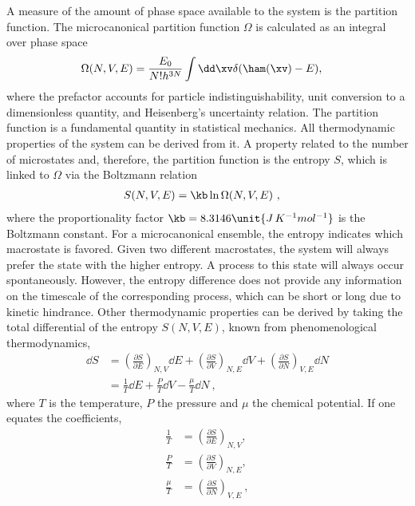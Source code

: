 %
A measure of the amount of phase space available to the system is the partition function. The microcanonical partition function $\Omega$ is calculated as an integral over phase space
%
\begin{align}
        \Omega(N,V,E) %
                      &= \frac{E_0}{N!h^{3N}} \int \dd \xv \delta(\ham(\xv) - E ),
\end{align}
%
where the prefactor 
accounts for particle indistinguishability,
unit conversion to a dimensionless quantity,
and Heisenberg's uncertainty relation.
%
The partition function is a fundamental quantity in statistical mechanics. All thermodynamic properties of the system can be derived from it. %
A property related to the number of microstates and, therefore, the partition function is the entropy $S$, which is linked to $\Omega$ via the Boltzmann relation
%
\begin{align}
        S(N,V,E) &= \kb \ln \Omega (N,V,E)\ ,
        \label{eq:boltzmann}
\end{align}
%
where the proportionality factor $\kb=8.3146\unit{J\,K^{-1}mol^{-1}}$ is the Boltzmann constant. 
For a microcanonical ensemble, the entropy indicates which macrostate is favored.
Given two different macrostates, the system will always prefer the state with the higher entropy. A process to this state will always occur spontaneously. However, the entropy difference does not 
provide
any information on the timescale of the corresponding process, which can
be short or 
long due to kinetic hindrance. Other thermodynamic properties can be derived by taking the total differential of the entropy $S(N,V,E)$, known from phenomenological thermodynamics,
%
\begin{align}
\dd S &= \left ( \frac{\partial S}{\partial E}\right ) _{N,V} \dd E +
\left ( \frac{\partial S}{\partial V} \right ) _{N,E} \dd V + \left ( \frac{\partial S}{\partial N} \right ) _{V,E} \dd N  \nonumber \\
 & = \frac{1}{T} \dd E + \frac{P}{T} \dd V - \frac{\mu}{T} \dd N\ ,
 \label{eq:tots}
\end{align}
%
where $T$ is the temperature, $P$ the pressure and $\mu$ the chemical potential.
If one equates the coefficients, \ie{}
%
\begin{align}
\frac{1}{T}&=\left ( \frac{\partial S}{\partial E} \right ) _{N,V},\nonumber \\
\frac{P}{T}&=\left ( \frac{\partial S}{\partial V} \right ) _{N,E}, \nonumber \\
\frac{\mu}{T}&=\left ( \frac{\partial S}{\partial N} \right ) _{V,E}\ ,
\label{eq:coeffs}
\end{align}
